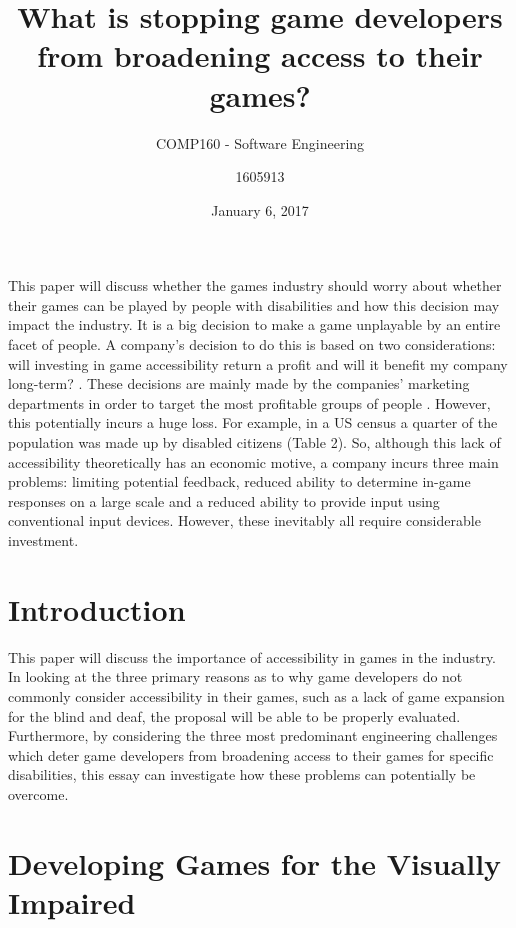 \documentclass[11pt]{scrartcl}
\title{What is stopping game developers from broadening access to their games? }
\date{January 6, 2017}
\subtitle{COMP160 - Software Engineering}
\author{1605913}
\begin{document}
\maketitle


This paper will discuss whether the games industry should worry about whether their games can be played by people with disabilities and how this decision may impact the industry. It is a big decision to make a game unplayable by an entire facet of people. A company’s decision to do this is based on two considerations: will investing in game accessibility return a profit and will it benefit my company long-term? \cite{bierre2005game}. These decisions are mainly made by the companies' marketing departments in order to target the most profitable groups of people \cite{kalapanidas2009playmancer}. However, this potentially incurs a huge loss. For example, in a US census a quarter of the population was made up by disabled citizens\cite{bierre2005game} (Table 2). So, although this lack of accessibility theoretically has an economic motive, a company incurs three main problems: limiting potential feedback, reduced ability to determine in-game responses on a large scale and a reduced ability to provide input using conventional input devices. However, these inevitably all require considerable investment\cite{yuan2011game}.

\section{Introduction}

This paper will discuss the importance of accessibility in games in the industry. In looking at the three primary reasons as to why game developers do not commonly consider accessibility in their games, such as a lack of game expansion for the blind and deaf, the proposal will be able to be properly evaluated. Furthermore, by considering the three most predominant engineering challenges which deter game developers from broadening access to their games for specific disabilities, this essay can investigate how these problems can potentially be overcome.

\section{Developing Games for the Visually Impaired}
\end{document}
